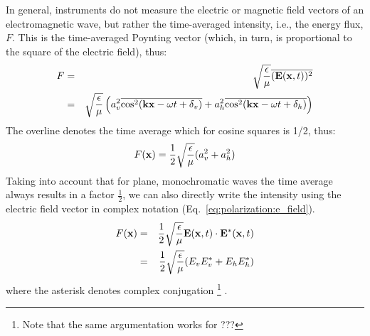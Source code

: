 In general, instruments do not measure the electric or magnetic field
vectors of an electromagnetic wave, but rather the time-averaged
intensity, i.e., the energy flux, $F$. This is the time-averaged Poynting
vector (which, in turn, is proportional to the square of the electric
field), thus:
\begin{eqnarray}
  F%
  &=& 
  \sqrt{\frac{\epsilon}{\mu}}\overline{(\VctStl{E}(\VctStl{x},t))^2}\\
   \nonumber
  &=&
  \sqrt{\frac{\epsilon}{\mu}}\left(
    a_v^2\overline{\cos^2(\VctStl{k}\VctStl{x} - \omega t + \delta_v)}
    + a_h^2\overline{\cos^2(\VctStl{k}\VctStl{x} - \omega t + \delta_h)}
   \right)
  \label{eq:polarization:intensity}
\end{eqnarray}
The overline denotes the time average
which for cosine squares is 1/2, thus:
\begin{equation}
  \label{eq:polarization:intensity_}
 F(\mathbf{x}) = 
  \frac{1}{2}\sqrt{\frac{\epsilon}{\mu}}(
    a_v^2 + a_h^2)  
\end{equation}
Taking into account that for plane, monochromatic waves 
the time average always results in a factor
$\frac{1}{2}$, we can also directly write the intensity using the
electric field vector in complex notation
(Eq.~\ref{eq:polarization:e_field}).
\begin{eqnarray}
  \label{eq:polarization:intensity_from_complex}
  F(\mathbf{x}) &=&  \frac{1}{2}\sqrt{\frac{\epsilon}{\mu}}
                      \mathbf{E} (\mathbf{x},t) 
                    \cdot \mathbf{E}^\ast (\mathbf{x},t)\\ \nonumber
               &=&     \frac{1}{2}\sqrt{\frac{\epsilon}{\mu}}
                     (E_v E_v^\ast + E_h E_h^\ast)
\end{eqnarray}
where the asterisk denotes complex conjugation%
\footnote{Note that the same argumentation works for ???} .

